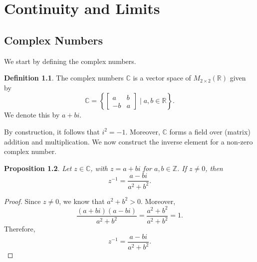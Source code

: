 \documentclass[a4paper, openany]{memoir}
\theoremstyle{definition}
\newtheorem{definition}{Definition}[section]
\theoremstyle{plain}
\newtheorem{proposition}[definition]{Proposition}
\begin{document}
\chapter{Continuity and Limits}
\section{Complex Numbers}
We start by defining the complex numbers.
\begin{definition}
The complex numbers $\mathbb{C}$ is a vector space of $M_{2 \times 2}(\mathbb{R})$ given by
\[\mathbb{C} = \left\{\begin{bmatrix}
a & b \\
-b & a
\end{bmatrix} \mid a, b \in \mathbb{R}\right\}.\]
We denote this by $a + bi$.
\end{definition}
\noindent By construction, it follows that $i^2 = -1$. Moreover, $\mathbb{C}$ forms a field over (matrix) addition and multiplication. We now construct the inverse element for a non-zero complex number.
\begin{proposition}
Let $z \in \mathbb{C}$, with $z = a + bi$ for $a, b \in \mathbb{Z}$. If $z \neq 0$, then 
\[z^{-1} = \frac{a - bi}{a^2 + b^2}.\]
\end{proposition}
\begin{proof}
Since $z \neq 0$, we know that $a^2 + b^2 > 0$. Moreover,
\[\frac{(a + bi)(a - bi)}{a^2 + b^2} = \frac{a^2 + b^2}{a^2 + b^2} = 1.\]
Therefore, 
\[z^{-1} = \frac{a - bi}{a^2 + b^2}.\]
\end{proof}
\end{document}
